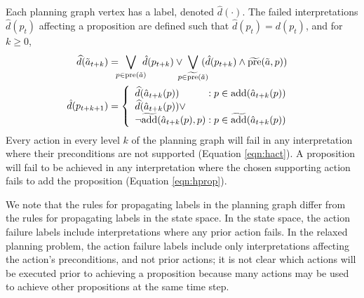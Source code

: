 \documentclass{article}
\begin{document}
 Each planning graph vertex has a label, denoted $\hat{d}(\cdot)$.  The failed interpretations $\hat{d}(p_t) $ affecting a proposition are defined such that $\hat{d}(p_t) = d(p_t)$, and for $k \geq 0$, 
\begin{align}
\widehat{d}(\tilde{a}_{t+k}) &= \hspace*{-.2cm} 
\bigvee\limits_{p \in \text{pre}(\tilde{a}) } \hspace*{-.2cm}   \hat{d}(p_{t+k}) \vee \hspace*{-.25cm} 
\bigvee\limits_{p \in \widetilde{\text{pre}}(\tilde{a})} \hspace*{-.25cm}  (\hat{d}(p_{t+k})  \wedge  \widetilde{\text{pre}}(\tilde{a}, p) )\label{eqn:hact}\\
 \hspace*{-.6cm} \hat{d}(p_{t+k+1}) &= 
\left\{\begin{array}{l@{\;}l@{\;}r}
\widehat{d}(\hat{a}_{t+k}(p)) & : p \in \text{add}(\hat{a}_{t+k}(p))\\
\widehat{d}(\hat{a}_{t+k}(p)) \vee \\
\neg\widetilde{\text{add}}(\hat{a}_{t+k}(p), p) & : p \in \widetilde{\text{add}}(\hat{a}_{t+k}(p))\end{array}\right. \hspace*{-.1cm}\label{eqn:hprop}
\end{align}
\noindent 
Every action in every level $k$ of the planning graph will fail in any interpretation where their preconditions are not supported (Equation \ref{eqn:hact}).  A proposition will fail to be achieved in any interpretation where the chosen supporting action fails to add the proposition (Equation \ref{eqn:hprop}).

We note that the rules for propagating labels in the planning graph differ from the rules for propagating labels in the state space.  In the state space, the action failure labels include interpretations where any prior action fails.  In the relaxed planning problem, the action failure labels include only interpretations affecting the action's preconditions, and not prior actions; it is not clear which actions will be executed prior to achieving a proposition because many actions may be used to achieve other propositions at the same time step.  
\end{document}
